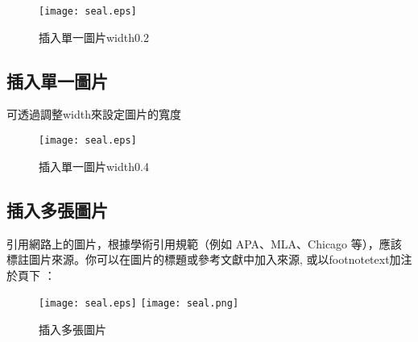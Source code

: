 \begin{figure}[htbp]
    \centering
    \texttt{[image: seal.eps]}
    \caption{插入單一圖片width0.2}
    \label{fig:insert-single-image}
\end{figure}

\subsection{插入單一圖片}
可透過調整width來設定圖片的寬度

\begin{figure}[htbp]
    \centering
    \texttt{[image: seal.eps]}
    \caption{插入單一圖片width0.4}
    \label{fig:insert-single-image}
\end{figure}


\newpage


\subsection{插入多張圖片}
引用網路上的圖片，根據學術引用規範（例如 APA、MLA、Chicago 等），應該標註圖片來源。你可以在圖片的標題或參考文獻中加入來源, 或以footnotetext加注於頁下 ：

\begin{figure}[ht]
\centering
\texttt{[image: seal.eps]}
\hfill
\texttt{[image: seal.png]}
\caption{插入多張圖片 \protect\footnotemark}
\end{figure}



